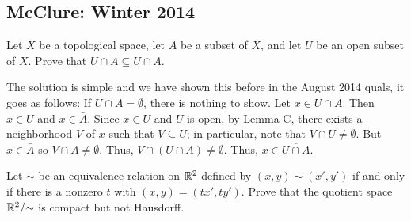 \subsection{McClure:  Winter 2014}
\setcounter{exercise}{0}
\begin{problem}
  Let \(X\) be a topological space, let \(A\) be a subset of \(X\), and let
  \(U\) be an open subset of \(X\). Prove that
  \(U\cap\bar A\subseteq\overline{U\cap A}\).
\end{problem}
\begin{solution}
  The solution is simple and we have shown this before in the August 2014
  quals, it goes as follows: If \(U\cap\bar A=\emptyset\), there is nothing
  to show. Let \(x\in U\cap\bar A\). Then \(x\in U\) and \(x\in\bar
  A\). Since \(x\in U\) and \(U\) is open, by Lemma C, there exists a
  neighborhood \(V\) of \(x\) such that \(V\subseteq U\); in particular,
  note that \(V\cap U\neq\emptyset\). But \(x\in\bar A\) so
  \(V\cap A\neq\emptyset\). Thus, \(V\cap(U\cap A)\neq\emptyset\). Thus,
  \(x\in\overline{U\cap A}\).
\end{solution}
\begin{problem}
  Let \(\sim\) be an equivalence relation on \(\mathbb{R}^2\) defined by
  \((x,y)\sim(x',y')\) if and only if there is a nonzero \(t\) with
  \((x,y)=(tx',ty')\). Prove that the quotient space \(\mathbb{R}^2/{\sim}\) is
  compact but not Hausdorff.
\end{problem}
